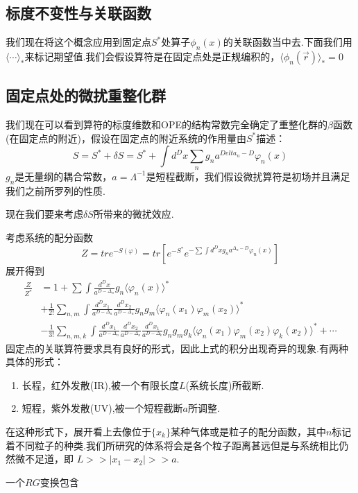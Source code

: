 \documentclass{ctexart}
\begin{document}
\subsection{标度不变性与关联函数}
我们现在将这个概念应用到固定点$S^*$处算子$\phi_n(x)$的关联函数当中去.下面我们用$\langle\cdots\rangle_*$来标记期望值.我们会假设算符是在固定点处是正规编积的，$\langle\phi_n(\vec{r})\rangle_*=0$
\subsection{固定点处的微扰重整化群}
我们现在可以看到算符的标度维数和OPE的结构常数完全确定了重整化群的$\beta$函数(在固定点的附近)，假设在固定点的附近系统的作用量由$S^*$描述：
$$S=S^*+\delta S=S^*+\int d^D x\sum_{n}g_na^{Delta_n-D}\varphi_n(x)$$
$g_n$是无量纲的耦合常数，$a=\Lambda^{-1}$是短程截断，我们假设微扰算符是初场并且满足我们之前所罗列的性质.\par 
现在我们要来考虑$\delta S$所带来的微扰效应.\par 
考虑系统的配分函数
$$Z=tr e^{-S(\varphi)}=tr\left[e^{-S^*}e^{-\sum\int d^D x g_na^{\Delta_n-D}\varphi_n(x)}\right]$$
展开得到
\begin{align*}
    \frac{Z}{Z^*} & =1+\sum\int \frac{d^Dx}{a^{D-\Delta_n}}g_n\langle\varphi_n(x)\rangle^*\\
& +\frac{1}{2!}\sum_{n,m}\int \frac{d^Dx_1}{a^{D-\Delta_n}}\frac{d^Dx_2}{a^{D-\Delta_n}}g_ng_m\langle\varphi_n(x_1)\varphi_m(x_2)\rangle^*\\
& -\frac{1}{3!}\sum_{n,m,k}\int \frac{d^Dx_1}{a^{D-\Delta_n}}\frac{d^Dx_2}{a^{D-\Delta_n}}\frac{d^Dx_1}{a^{D-\Delta_k}}g_ng_mg_k\langle\varphi_n(x_1)\varphi_m(x_2)\varphi_k(x_2)\rangle^*+\cdots
\end{align*}
固定点的关联算符要求具有良好的形式，因此上式的积分出现奇异的现象.有两种具体的形式：
\begin{enumerate}
    \item 长程，红外发散(IR),被一个有限长度$L$(系统长度)所截断.
    \item 短程，紫外发散(UV),被一个短程截断$a$所调整.
\end{enumerate}
在这种形式下，展开看上去像位于$\{x_k\}$某种气体或是粒子的配分函数，其中$n$标记着不同粒子的种类.我们所研究的体系将会是各个粒子距离甚远但是与系统相比仍然微不足道，即
$L>>|x_1-x_2|>>a$.\par 
一个$RG$变换包含
\end{document}
